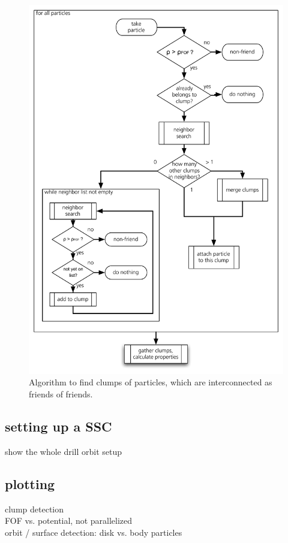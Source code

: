 \begin{figure}[htbp]
\begin{center}
\includegraphics[scale=0.6]{25algo_fof2.pdf}
\caption{Algorithm to find clumps of particles, which are interconnected as friends of friends.}
\label{ch02_fig25}
\end{center}
\end{figure}



\subsection{setting up a SSC}
show the whole drill
orbit setup


\subsection{plotting}
clump detection\\
FOF vs. potential, not parallelized\\
orbit / surface detection: disk vs. body particles\\

